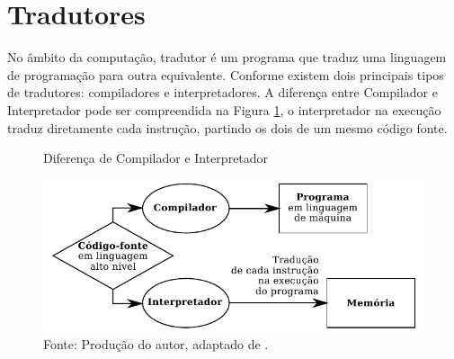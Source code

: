 
\section{Tradutores}


No âmbito da computação, tradutor é um programa que traduz uma linguagem de programação para outra equivalente. Conforme  existem dois principais tipos de tradutores: compiladores e interpretadores. A diferença entre Compilador e Interpretador pode ser compreendida na Figura \ref{fig:versus}, o interpretador na execução traduz diretamente cada instrução, partindo os dois de um mesmo código fonte.

\begin{figure}[h]
  \caption{Diferença de Compilador e Interpretador}\label{fig:versus}
  \centering
\includegraphics[width=.75\textwidth,keepaspectratio]{figures/compilador-interpretador.pdf}
  \caption*{\footnotesize Fonte: Produção do autor, adaptado de .}
\end{figure}

